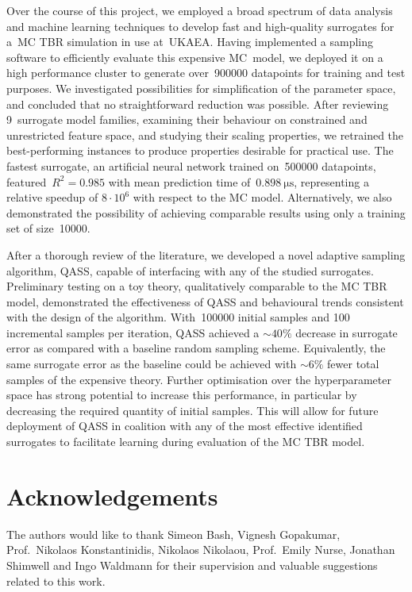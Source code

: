 Over the course of this project, we employed a broad spectrum of data
analysis and machine learning techniques to develop fast and high-quality
surrogates for a~MC TBR simulation in use at~UKAEA. Having implemented a sampling
software to efficiently evaluate this expensive MC~model, we deployed it on a
high performance cluster to generate over~\num{900000}
datapoints for training and test purposes. We
investigated possibilities for simplification of the parameter space, and
concluded that no straightforward reduction was possible. After reviewing
9~surrogate model families, examining their behaviour on constrained and
unrestricted feature space, and studying their scaling properties, we retrained
the best-performing instances to produce properties desirable for
practical use. The fastest surrogate, an artificial neural network trained
on~\num{500000} datapoints, featured~$R^2=\num{0.985}$ with mean prediction time
of~$\SI{0.898}{\micro\second}$, representing a relative
speedup of $8\cdot 10^6$ with respect to the MC model. Alternatively, we
also demonstrated the possibility of achieving comparable results using only a
training set of size~\num{10000}.

After a thorough review of the literature, we developed a novel adaptive
sampling algorithm, QASS, capable of interfacing with any of the studied
surrogates. Preliminary testing on a toy theory, qualitatively comparable to
the MC TBR model, demonstrated the effectiveness of QASS and behavioural trends
consistent with the design of the algorithm. With~\num{100000} initial samples and 100 incremental samples per iteration, QASS achieved a ${\sim}40\%$ decrease in surrogate error as compared with a baseline random sampling scheme. Equivalently, the same surrogate error as the baseline could be achieved with ${\sim}6\%$ fewer total samples of the expensive theory. Further optimisation over the hyperparameter space has strong
potential to increase this performance, in particular by decreasing the required quantity of initial samples. This will allow for future deployment of QASS
in coalition with any of the most effective identified surrogates to facilitate
learning during evaluation of the MC TBR model.


\section*{Acknowledgements}

The authors would like to thank Simeon Bash, Vignesh Gopakumar, Prof.~Nikolaos
Konstantinidis, Nikolaos Nikolaou, Prof.~Emily Nurse, Jonathan Shimwell and Ingo
Waldmann for their supervision and valuable suggestions related to this work.

